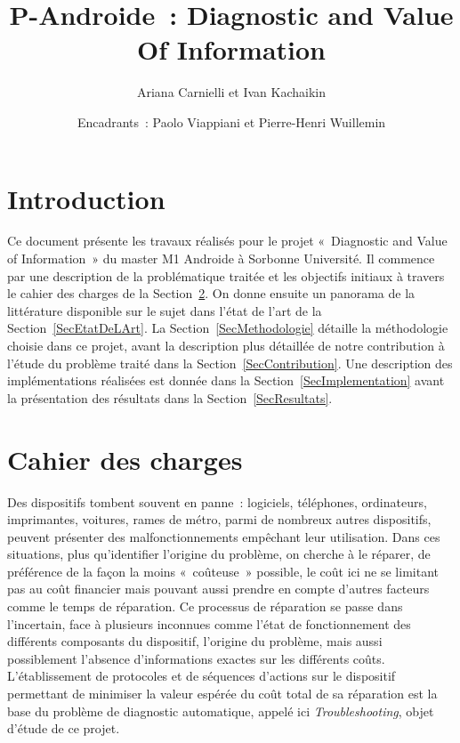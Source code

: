 \documentclass[a4paper,11pt]{article}
\theoremstyle{plain}
\theoremstyle{definition}
\begin{document}


\pagestyle{plain}

\title{P-Androide~: Diagnostic and Value Of Information}
\author{Ariana Carnielli et Ivan Kachaikin}
\date{Encadrants~: Paolo Viappiani et Pierre-Henri Wuillemin}
\maketitle

\tableofcontents


\section{Introduction}

Ce document présente les travaux réalisés pour le projet «~Diagnostic and Value of Information~» du master M1 Androide à Sorbonne Université. Il commence par une description de la problématique traitée et les objectifs initiaux à travers le cahier des charges de la Section~\ref{SecCharges}. On donne ensuite un panorama de la littérature disponible sur le sujet dans l'état de l'art de la Section~\ref{SecEtatDeLArt}. La Section~\ref{SecMethodologie} détaille la méthodologie choisie dans ce projet, avant la description plus détaillée de notre contribution à l'étude du problème traité dans la Section~\ref{SecContribution}. Une description des implémentations réalisées est donnée dans la Section~\ref{SecImplementation} avant la présentation des résultats dans la Section~\ref{SecResultats}.

\section{Cahier des charges}
\label{SecCharges}

Des dispositifs tombent souvent en panne~: logiciels, téléphones, ordinateurs, imprimantes, voitures, rames de métro, parmi de nombreux autres dispositifs, peuvent présenter des malfonctionnements empêchant leur utilisation. Dans ces situations, plus qu'identifier l'origine du problème, on cherche à le réparer, de préférence de la façon la moins «~coûteuse~» possible, le coût ici ne se limitant pas au coût financier mais pouvant aussi prendre en compte d'autres facteurs comme le temps de réparation. Ce processus de réparation se passe dans l'incertain, face à plusieurs inconnues comme l'état de fonctionnement des différents composants du dispositif, l'origine du problème, mais aussi possiblement l'absence d'informations exactes sur les différents coûts. L'établissement de protocoles et de séquences d'actions sur le dispositif permettant de minimiser la valeur espérée du coût total de sa réparation est la base du problème de diagnostic automatique, appelé ici \emph{Troubleshooting}, objet d'étude de ce projet.
\end{document}
